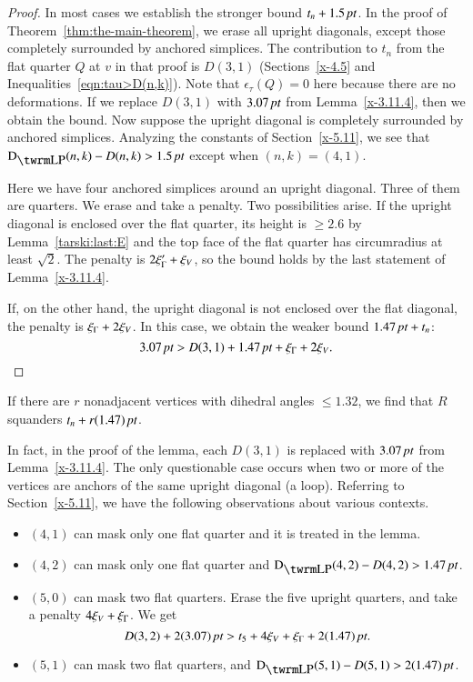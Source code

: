 \begin{proof}
In most cases we establish the stronger bound $t_n+1.5\,\hbox{\it pt}$. In the
proof of Theorem~\ref{thm:the-main-theorem}, we erase all upright
diagonals, except those completely surrounded by anchored simplices. The
contribution to $t_n$ from the flat quarter $Q$ at $v$ in that proof is
$D(3,1)$ (Sections~\ref{x-4.5} and Inequalities~\ref{eqn:tau>D(n,k)}).
Note that $\epsilon_\tau(Q)=0$ here because there are no deformations.
If we replace $D(3,1)$ with $3.07\,\hbox{\it pt}$ from Lemma~\ref{x-3.11.4}, then
we obtain the bound. Now suppose the upright diagonal is completely
surrounded by anchored simplices. Analyzing the constants of
Section~\ref{x-5.11}, we see that $\DLP(n,k)-D(n,k)>1.5\,\pt$ except
when $(n,k)=(4,1)$.

Here we have four anchored simplices around an upright diagonal. Three
of them are quarters.  We erase and take a penalty. Two possibilities
arise.  If the upright diagonal is enclosed over the flat quarter, its
height is $\ge2.6$ by Lemma~\ref{tarski:last:E} and the top face of the
flat quarter has circumradius at least $\sqrt2$.  The penalty is
$2\xi_\Gamma'+\xi_V$, so the bound holds by the last statement of
Lemma~\ref{x-3.11.4}.

If, on the other hand, the upright diagonal is not enclosed over the
flat diagonal, the penalty is $\xi_\Gamma+2\xi_V$.  In this case, we obtain the
weaker bound $1.47\,\hbox{\it pt}+t_n$:
    $$3.07\,\hbox{\it pt} > D(3,1) + 1.47\,\hbox{\it pt} +\xi_\Gamma+2\xi_V.$$
\end{proof}

\begin{remark} \label{remark:1.47}
If there are $r$ nonadjacent vertices with dihedral angles
$\le1.32$, we find that $R$ squanders $t_n+r(1.47)\,\hbox{\it pt}$.
\end{remark}

In fact, in the proof of the lemma, each $D(3,1)$ is replaced with
$3.07\,\hbox{\it pt}$ from Lemma~\ref{x-3.11.4}.  The only questionable case
occurs when two or more of the vertices are anchors of the same upright
diagonal (a loop). Referring to Section~\ref{x-5.11}, we have the
following observations about various contexts.

\begin{itemize}
    \item $(4,1)$ can mask only one flat quarter and it is treated in the
lemma.
    \item $(4,2)$ can mask only one flat quarter and
    $\DLP(4,2)-D(4,2)>1.47\,\pt$.
    \item $(5,0)$ can mask two flat quarters.  Erase the five upright quarters,
        and take a penalty $4\xi_V+\xi_\Gamma$.  We get
    $$D(3,2)+2(3.07)\,\hbox{\it pt} > t_5+4\xi_V+\xi_\Gamma+2(1.47)\,\hbox{\it pt}.$$
    \item $(5,1)$ can mask two flat quarters, and $\DLP(5,1)-D(5,1)>2(1.47)\,\pt$.
\end{itemize}




